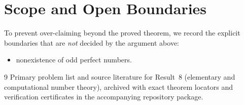 \documentclass[10pt,reqno]{amsart}
\theoremstyle{definition}
\begin{document}
\section{Scope and Open Boundaries}

To prevent over-claiming beyond the proved theorem, we record the explicit boundaries that are \emph{not} decided by the argument above:
\begin{itemize}
  \item nonexistence of odd perfect numbers.
\end{itemize}

\begin{thebibliography}{9}
Primary problem list and source literature for Result~8 (elementary and computational number theory), archived with exact theorem locators and verification certificates in the accompanying repository package.
\end{thebibliography}
\end{document}
